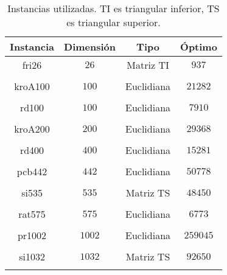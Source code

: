 \begin{table}[H]
	\centering
	\begin{tabular}{cccc}
		\toprule
		Instancia & Dimensión & Tipo & Óptimo\\
		\midrule
		fri26 &$26$ & Matriz TI &$ 937$\\\\
		\midrule
		kroA100 &$100$ & Euclidiana &$21282$\\\\

		\midrule
		rd100 &$100$ & Euclidiana  &$7910$\\\\
		\midrule
		kroA200 &$200$ & Euclidiana &$29368$\\\\
		\midrule
		rd400 &$400$ & Euclidiana  &$15281$\\\\
		\midrule
		pcb442 &$442$ & Euclidiana &$50778$\\\\
		\midrule
		si535& $535$ & Matriz TS  &$48450$\\\\
		\midrule
		rat575 &$575$ & Euclidiana &$6773$\\\\
		\midrule
		pr1002 &$1002$ & Euclidiana &$259045$\\\\
		\midrule
		si1032 &$1032$ & Matriz TS &$92650$\\\\
		\bottomrule
	\end{tabular}
	\caption{Instancias utilizadas. TI es triangular inferior, TS es triangular superior.}
	\label{instances}

	\end{table}

